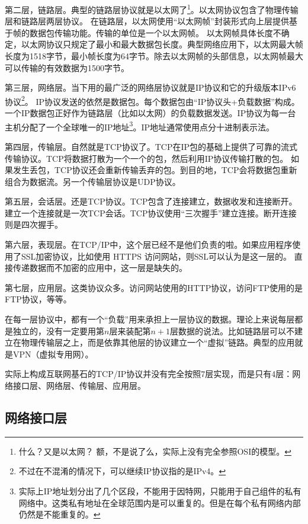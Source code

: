 第二层，链路层。典型的链路层协议就是以太网了\footnote{什么？又是以太网？ 额，不是说了么，实际上没有完全参照OSI的模型。}。以太网协议包含了物理传输层和链路层两层协议。
在链路层，以太网使用“以太网帧”封装形式向上层提供基于帧的数据包传输功能。传输的单位是一个以太网帧。 以太网帧具体长度不确定，以太网协议只规定了最小和最大数据包长度。典型网络应用下，以太网最大帧长度为1518字节，最小帧长度为64字节。除去以太网帧的头部信息，以太网帧最大可以传输的有效数据为1500字节。

第三层，网络层。当下用的最广泛的网络层协议就是IP协议和它的升级版本IPv6协议\footnote{不过在不混淆的情况下，可以继续IP协议指的是IPv4。}。
IP协议发送的依然是数据包。每个数据包由“IP协议头+负载数据”构成。一个IP数据包正好作为链路层（比如以太网）的负载数据发送。IP协议为每一台主机分配了一个全球唯一的IP地址\footnote{实际上IP地址划分出了几个区段，不能用于因特网，只能用于自己组件的私有网络中。这类私有地址在全球范围内是可以重复的。但是在每个私有网络内部仍然是不能重复的。}。IP地址通常使用点分十进制表示法。

第四层，传输层。自然就是TCP协议了。TCP在IP包的基础上提供了可靠的流式传输协议。TCP将数据打散为一个一个的包，然后利用IP协议传输打散的包。
如果发生丢包，TCP协议还会重新传输丢弃的包。到目的地，TCP会将数据包重新组合为数据流。另一个传输层协议是UDP协议。 %

第五层，会话层。还是TCP协议。TCP包含了连接建立，数据收发和连接断开。建立一个连接就是一次TCP会话。TCP协议使用“三次握手”建立连接。断开连接则是四次握手。

第六层，表现层。在TCP/IP中，这个层已经不是他们负责的啦。如果应用程序使用了SSL加密协议，比如使用 HTTPS 访问网站，则SSL可以认为是这一层的。
直接传递数据而不加密的应用中，这一层是缺失的。

第七层，应用层。这类协议众多。访问网站使用的HTTP协议，访问FTP使用的是FTP协议，等等。

在每一层协议中，都有一个“负载”用来承担上一层协议的数据。理论上来说每层都是独立的，没有一定要用第$n$层来装配第$n+1$层数据的说法。比如链路层可以不建立在物理传输层之上，而是依靠其他层的协议建立一个“虚拟”链路。典型的应用就是VPN（虚拟专用网）。


实际上构成互联网基石的TCP/IP协议并没有完全按照7层实现，而是只有4层：网络接口层、网络层、传输层、应用层。

\subsection{网络接口层}

